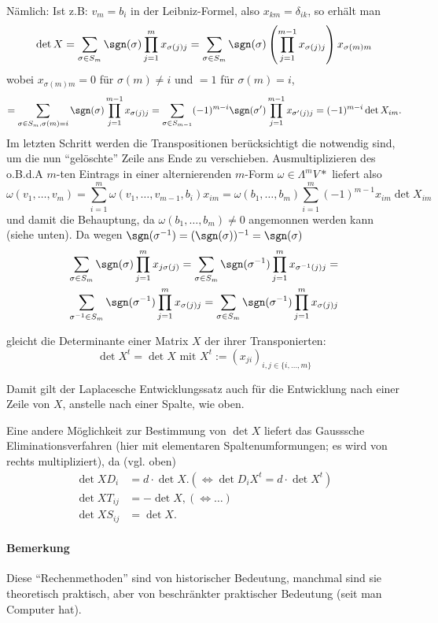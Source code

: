 	Nämlich: Ist z.B: $ v_m=b_i $ in der Leibniz-Formel, also $ x_{km}=\delta_{ik} $, so erhält man
		\[ \det X = \sum_{\sigma\in S_m}\sgn(\sigma)\prod_{j=1}^{m}x_{\sigma(j)j}=\sum_{\sigma\in S_m}\sgn(\sigma)\left(\prod_{j=1}^{m-1}x_{\sigma(j)j}\right)x_{\sigma(m)m} \]
	wobei $ x_{\sigma(m)m} = 0 $ für $ \sigma(m)\neq i $ und $ =1 $ für $ \sigma(m) = i $,
		\[ = \sum_{\sigma\in S_m, \sigma(m)=i}\sgn(\sigma)\prod_{j=1}^{m-1}x_{\sigma(j)j} = \sum_{\sigma\in S_{m-1}}(-1)^{m-i}\sgn(\sigma')\prod_{j=1}^{m-1}x_{\sigma'(j)j} = (-1)^{m-i}\det X_{im}. \]
	Im letzten Schritt werden die Transpositionen berücksichtigt die notwendig sind, um die nun "`gelöschte"' Zeile ans Ende zu verschieben. Ausmultiplizieren des o.B.d.A $ m $-ten Eintrags in einer alternierenden $ m $-Form $ \omega\in \Lambda^mV* $ liefert also 
		\[ \omega(v_1,\dots,v_m) = \sum_{i=1}^{m}\omega(v_1,\dots,v_{m-1},b_i)x_{im} = \omega(b_1,\dots,b_m)\sum_{i=1}^{m}(-1)^{m-1}x_{im}\det X_{im} \]
	und damit die Behauptung, da $ \omega(b_1,\dots,b_m)\neq 0 $ angemonnen werden kann (siehe unten).
	Da wegen $ \sgn(\sigma^{-1})=(\sgn(\sigma))^{-1} = \sgn(\sigma) $
		\begin{gather*}
		\sum_{\sigma\in S_m}\sgn(\sigma)\prod_{j=1}^{m}x_{j\sigma(j)} =
		\sum_{\sigma\in S_m} \sgn(\sigma^{-1})\prod_{j=1}^{m}x_{\sigma^{-1}(j)j} =\\
		\sum_{\sigma^{-1}\in S_m} \sgn(\sigma^{-1})\prod_{j=1}^{m}x_{\sigma(j)j} =
		\sum_{\sigma\in S_m} \sgn(\sigma^{-1})\prod_{j=1}^{m}x_{\sigma(j)j}
		\end{gather*}
	\begin{Definition}
		gleicht die Determinante einer Matrix $ X $ der ihrer Transponierten:
		\[ \det X^t = \det X \text{ mit } X^t := (x_{ji})_{i,j\in \{i,\dots, m \}} \]
	\end{Definition}
	Damit gilt der Laplacesche Entwicklungssatz auch für die Entwicklung nach einer Zeile von $ X $, anstelle nach einer Spalte, wie oben.
	
	Eine andere Möglichkeit zur Bestimmung von $ \det X $ liefert das Gausssche Eliminationsverfahren (hier mit elementaren Spaltenumformungen; es wird von rechts multipliziert), da (vgl. oben)
		\begin{align*}
		\det XD_i &= d\cdot \det X. (\Leftrightarrow \det D_iX^t = d\cdot \det X^t)\\
		\det XT_{ij} &= -\det X, (\Leftrightarrow\dots)\\
		\det XS_{ij} &= \det X.
		\end{align*}
\paragraph{Bemerkung}
	Diese "`Rechenmethoden"' sind von historischer Bedeutung, manchmal sind sie theoretisch praktisch, aber von beschränkter praktischer Bedeutung (seit man Computer hat).

